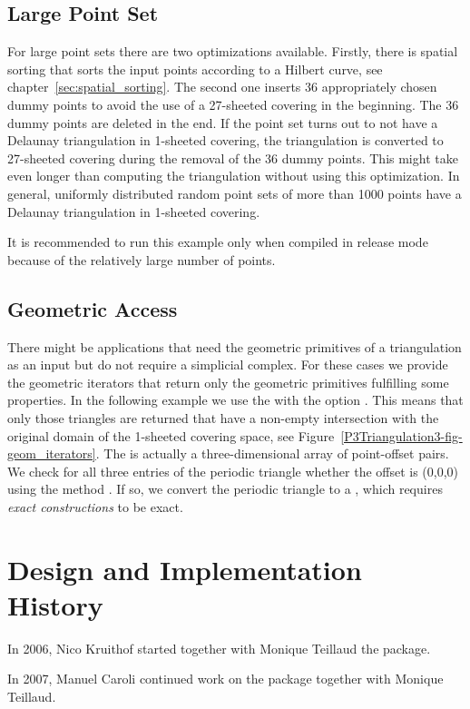

\subsection{Large Point Set}

For large point sets there are two optimizations available. Firstly,
there is spatial sorting that sorts the input points according to a
Hilbert curve, see chapter~\ref{sec:spatial_sorting}.
The second one inserts 36 appropriately chosen dummy points to avoid
the use of a 27-sheeted covering in the beginning. The 36 dummy
points are deleted in the end. If the point set turns out to not have
a Delaunay triangulation in 1-sheeted covering, the triangulation is
converted to 27-sheeted covering during the removal of the 36 dummy
points. This might take even longer than computing the triangulation
without using this optimization. In general, uniformly distributed
random point sets of more than 1000 points have a Delaunay
triangulation in 1-sheeted covering.

It is recommended to run this example only when compiled in release
mode because of the relatively large number of points. 


\subsection{Geometric Access}

There might be applications that need the geometric primitives of a
triangulation as an input but do not require a simplicial complex. For
these cases we provide the geometric iterators that return only the
geometric primitives fulfilling some properties. In the following
example we use the  with the option
. This means that only those triangles are
returned that have a non-empty intersection with the original domain
of the 1-sheeted covering space, see
Figure~\ref{P3Triangulation3-fig-geom_iterators}.
The  is actually a three-dimensional array of
point-offset pairs. We check for all three entries of the periodic
triangle whether the offset  is (0,0,0) using the
method . If so, we convert the periodic triangle to a
, which requires \emph{exact constructions} to be
exact.  


\section{Design and Implementation History}

In 2006, Nico Kruithof started together with Monique Teillaud the
 package.

In 2007, Manuel Caroli continued work on the
 package together with Monique
Teillaud.
